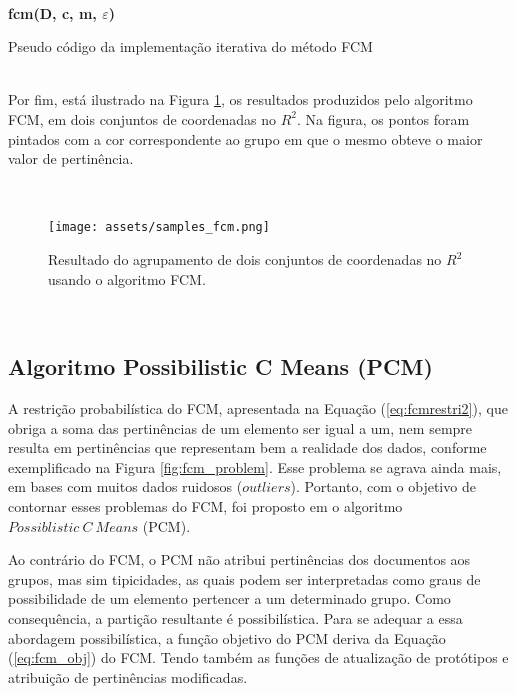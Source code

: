 \leavevmode\\
\begin{algorithm}[H] 
  \SetAlgoLined 
  \textbf{{\color{blue}fcm}(D, c, m, $\varepsilon$)}\\
  \caption{Pseudo código da implementação iterativa do método FCM}
\label{alg:fcm} 
\end{algorithm} 
\leavevmode\\

Por fim, está ilustrado na Figura \ref{fig:samples_fcm}, os resultados produzidos pelo algoritmo
FCM, em dois conjuntos de coordenadas no $R^2$. Na figura, os pontos foram pintados com a cor
correspondente ao grupo em que o mesmo obteve o maior valor de pertinência.

\leavevmode\\
\begin{figure}[!htp] 
  \centering 
  \texttt{[image: assets/samples\_fcm.png]}
  \caption{Resultado do agrupamento de dois conjuntos de coordenadas no $R^2$ usando o algoritmo
  FCM\protect\footnotemark.} 
  \label{fig:samples_fcm} 
\end{figure}
\leavevmode\\

\subsection{Algoritmo Possibilistic C Means (PCM)}

A restrição probabilística do FCM, apresentada na Equação (\ref{eq:fcmrestri2}), que obriga a soma
das pertinências de um elemento ser igual a um, nem sempre resulta em pertinências que representam
bem a realidade dos dados, conforme exemplificado na Figura \ref{fig:fcm_problem}.  Esse problema se
agrava ainda mais, em bases com muitos dados ruidosos ($outliers$). Portanto, com o objetivo de
contornar esses problemas do FCM, foi proposto em  o algoritmo
$Possiblistic\ C\ Means$ (PCM). 

Ao contrário do FCM, o PCM não atribui pertinências dos documentos aos grupos, mas sim tipicidades,
as quais podem ser interpretadas como graus de possibilidade de um elemento pertencer a um
determinado grupo. Como consequência, a partição resultante é possibilística. Para se adequar a essa
abordagem possibilística, a função objetivo do PCM deriva da Equação (\ref{eq:fcm_obj}) do FCM.
Tendo também as funções de atualização de protótipos e atribuição de pertinências modificadas.

